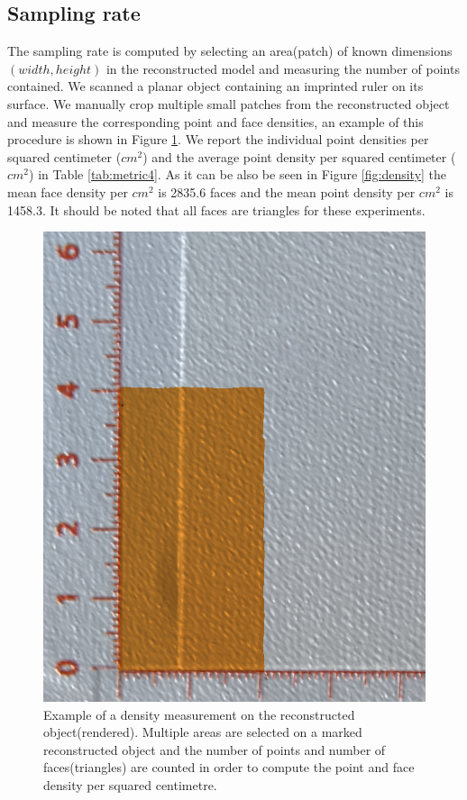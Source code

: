 \documentclass[final,12pt,3p]{elsarticle}
\begin{document}
\subsection{Sampling rate}
The sampling rate is computed by selecting an area(patch) of known dimensions $(width, height)$ in the reconstructed model and measuring the number of points contained. We scanned a planar object containing an imprinted ruler on its surface. We manually crop multiple small patches from the reconstructed object and measure the corresponding point and face densities, an example of this procedure is shown in Figure \ref{fig:area_selection}. We report the individual point densities per squared centimeter ($cm^2$) and the average point density per squared centimeter ($cm^2$) in Table \ref{tab:metric4}. As it can be also be seen in Figure \ref{fig:density} the mean face density per $cm^2$ is 2835.6 faces and the mean point density per $cm^2$ is 1458.3. It should be noted that all faces are triangles for these experiments.

\begin{figure}[!ht]
	\centering	
	\includegraphics[scale=0.35]{./area_selection.png}
	\caption{\label{fig:area_selection} Example of a density measurement on the reconstructed object(rendered). Multiple areas are selected on a marked reconstructed object and the number of points and number of faces(triangles) are counted in order to compute the point and face density per squared centimetre. }
\end{figure}
\end{document}
